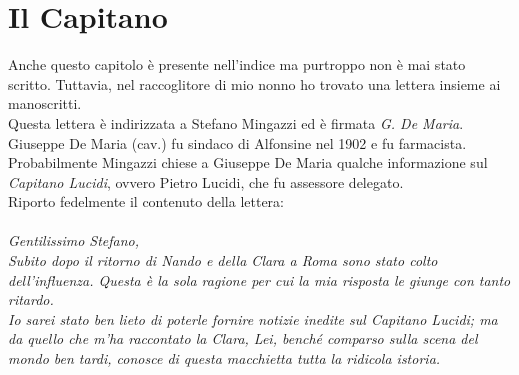
\chapter{Il Capitano}
Anche questo capitolo è presente nell'indice ma purtroppo non è mai stato scritto. Tuttavia, nel raccoglitore di mio nonno ho trovato una lettera insieme ai manoscritti.\\
\indent Questa lettera è indirizzata a Stefano Mingazzi ed è firmata \emph{G. De Maria}. Giuseppe De Maria (cav.) fu sindaco di Alfonsine nel 1902 e fu farmacista.\\
\indent Probabilmente Mingazzi chiese a Giuseppe De Maria qualche informazione sul \emph{Capitano Lucidi}, ovvero Pietro Lucidi, che fu assessore delegato.\\

\indent Riporto fedelmente il contenuto della lettera:\\\\
\textit{
	Gentilissimo Stefano,\\
	Subito dopo il ritorno di Nando e della Clara a Roma sono stato colto dell'influenza. Questa è la sola ragione per cui la mia risposta le giunge con tanto ritardo.\\
	Io sarei stato ben lieto di poterle fornire notizie inedite sul Capitano Lucidi; ma da quello che m'ha raccontato la Clara, Lei, benché comparso sulla scena del mondo ben tardi, conosce di questa macchietta tutta la ridicola istoria.\\
	}
	
